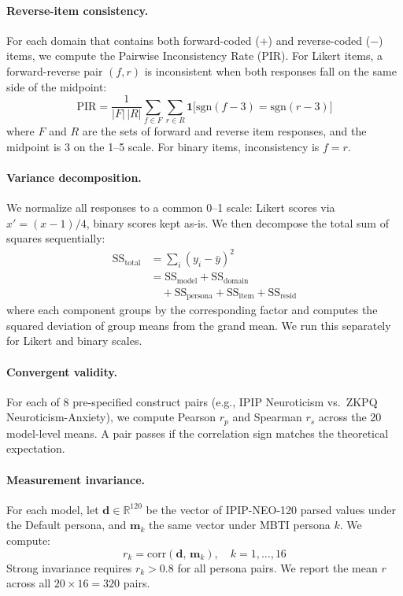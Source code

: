 \documentclass[11pt]{article}
\begin{document}
\paragraph{Reverse-item consistency.}
For each domain that contains both forward-coded ($+$) and reverse-coded ($-$) items, we compute the Pairwise Inconsistency Rate (PIR). For Likert items, a forward-reverse pair $(f, r)$ is inconsistent when both responses fall on the same side of the midpoint:
{\small
\begin{equation}
\mathrm{PIR} = \frac{1}{|F|\,|R|} \sum_{f \in F}\sum_{r \in R} \mathbf{1}\!\bigl[\mathrm{sgn}(f{-}3) = \mathrm{sgn}(r{-}3)\bigr]
\label{eq:pir}
\end{equation}
}
where $F$ and $R$ are the sets of forward and reverse item responses, and the midpoint is 3 on the 1--5 scale. For binary items, inconsistency is $f = r$.

\paragraph{Variance decomposition.}
We normalize all responses to a common 0--1 scale: Likert scores via $x' = (x - 1)/4$, binary scores kept as-is. We then decompose the total sum of squares sequentially:
\begin{equation}
\begin{split}
\mathrm{SS}_{\mathrm{total}} &= \sum_{i}(y_i - \bar{y})^2 \\
&= \mathrm{SS}_{\mathrm{model}} + \mathrm{SS}_{\mathrm{domain}} \\
&\quad + \mathrm{SS}_{\mathrm{persona}} + \mathrm{SS}_{\mathrm{item}} + \mathrm{SS}_{\mathrm{resid}}
\end{split}
\label{eq:variance}
\end{equation}
where each component groups by the corresponding factor and computes the squared deviation of group means from the grand mean. We run this separately for Likert and binary scales.

\paragraph{Convergent validity.}
For each of 8 pre-specified construct pairs (e.g., IPIP Neuroticism vs.\ ZKPQ Neuroticism-Anxiety), we compute Pearson $r_p$ and Spearman $r_s$ across the 20 model-level means. A pair passes if the correlation sign matches the theoretical expectation.

\paragraph{Measurement invariance.}
For each model, let $\mathbf{d} \in \mathbb{R}^{120}$ be the vector of IPIP-NEO-120 parsed values under the Default persona, and $\mathbf{m}_k$ the same vector under MBTI persona $k$. We compute:
\begin{equation}
r_k = \mathrm{corr}(\mathbf{d},\, \mathbf{m}_k), \quad k = 1, \ldots, 16
\label{eq:invariance}
\end{equation}
Strong invariance requires $r_k > 0.8$ for all persona pairs. We report the mean $r$ across all $20 \times 16 = 320$ pairs.
\end{document}
